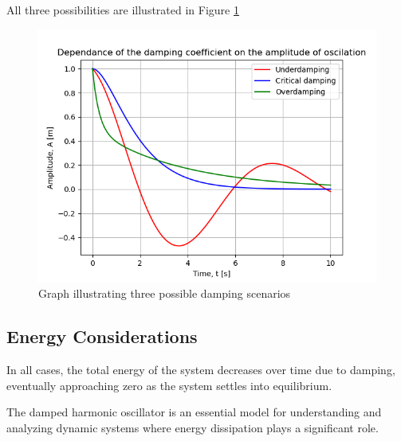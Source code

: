 \documentclass{article}
\begin{document}
All three possibilities are illustrated in Figure \ref{fig:1}

\begin{figure}[h]
    \centering
    \includegraphics[width=0.8\linewidth]{Fig_test2.png}
    \caption{Graph illustrating three possible damping scenarios}
    \label{fig:1}
\end{figure}

\subsection*{Energy Considerations}
In all cases, the total energy of the system decreases over time due to damping, eventually approaching zero as the system settles into equilibrium.

The damped harmonic oscillator is an essential model for understanding and analyzing dynamic systems where energy dissipation plays a significant role.
\end{document}
